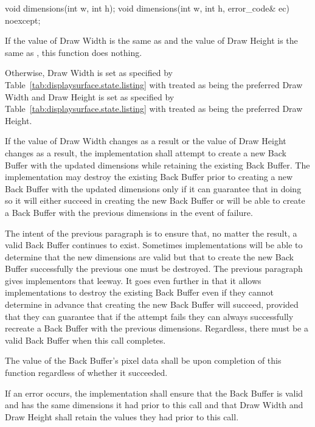 \begin{itemdecl}
void dimensions(int w, int h);
void dimensions(int w, int h, error_code& ec) noexcept;
\end{itemdecl}
\begin{itemdescr}
\pnum
\effects
If the value of Draw Width is the same as  and the value of Draw Height is the same as , this function does nothing.

\pnum
Otherwise, Draw Width is set as specified by Table~\ref{tab:displaysurface.state.listing} with  treated as being the preferred Draw Width and Draw Height is set as specified by Table~\ref{tab:displaysurface.state.listing} with  treated as being the preferred Draw Height.

\pnum
If the value of Draw Width changes as a result or the value of Draw Height changes as a result, the implementation shall attempt to create a new Back Buffer with the updated dimensions while retaining the existing Back Buffer. The implementation may destroy the existing Back Buffer prior to creating a new Back Buffer with the updated dimensions only if it can guarantee that in doing so it will either succeed in creating the new Back Buffer or will be able to create a Back Buffer with the previous dimensions in the event of failure.

\pnum
\begin{note}
The intent of the previous paragraph is to ensure that, no matter the result, a valid Back Buffer continues to exist. Sometimes implementations will be able to determine that the new dimensions are valid but that to create the new Back Buffer successfully the previous one must be destroyed. The previous paragraph gives implementors that leeway. It goes even further in that it allows implementations to destroy the existing Back Buffer even if they cannot determine in advance that creating the new Back Buffer will succeed, provided that they can guarantee that if the attempt fails they can always successfully recreate a Back Buffer with the previous dimensions. Regardless, there must be a valid Back Buffer when this call completes.
\end{note}

\pnum
The value of the Back Buffer's pixel data shall be \unspecnorm upon completion of this function regardless of whether it succeeded.

\pnum
If an error occurs, the implementation shall ensure that the Back Buffer is valid and has the same dimensions it had prior to this call and that Draw Width and Draw Height shall retain the values they had prior to this call.


\end{itemdescr}
